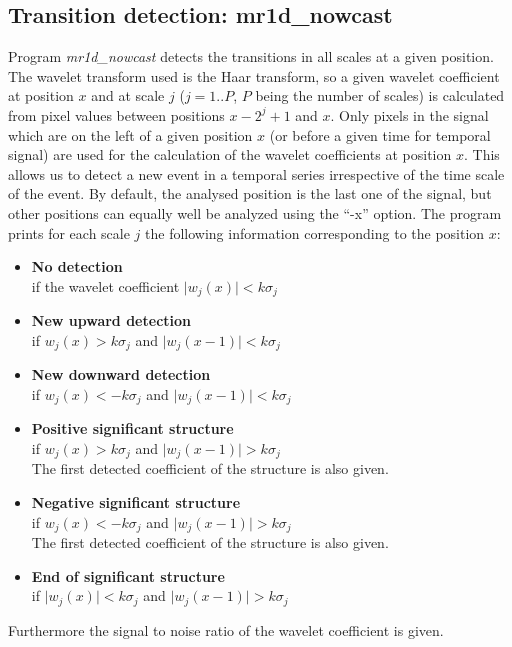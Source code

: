 \subsection{Transition detection: mr1d\_nowcast}
Program {\em mr1d\_nowcast} detects the transitions in all scales at a 
given position. The wavelet transform used is the Haar transform,
so a given wavelet coefficient at position $x$ and at scale $j$ ($j=1..P$,
$P$ being the number of scales)
is calculated from pixel values between  positions $x-2^{j}+1$ and $x$.
Only pixels in the signal which are on the left of a given position $x$
(or before a given time for temporal signal) are
used for the calculation of the wavelet coefficients at position $x$.
This allows us to detect a new event in a temporal series 
irrespective of the time 
scale of the event.
By default, the analysed position is the last one of the signal, but other
positions can equally well be analyzed using the ``-x'' option. The program
prints for each scale $j$ the following information corresponding to 
the position $x$:
\begin{itemize}
\item {\bf No detection} \\
 if the wavelet coefficient $\mid w_j(x) \mid  < k \sigma_j$
\item {\bf New upward detection}\\
 if $  w_j(x) > k \sigma_j$  and $\mid w_j(x-1) \mid  < k \sigma_j$
\item {\bf New downward detection}\\
 if $  w_j(x) < - k \sigma_j$ and $\mid w_j(x-1) \mid  < k \sigma_j$
\item {\bf Positive significant structure}\\
 if $  w_j(x) > k \sigma_j$ and $\mid w_j(x-1) \mid  > k \sigma_j$ \\
The first detected coefficient of the structure is also given.
\item {\bf Negative significant structure}\\
 if $  w_j(x) < -k \sigma_j$ and $\mid w_j(x-1) \mid  > k \sigma_j$ \\
The first detected coefficient of the structure is also given.
\item {\bf End of significant structure}\\
 if $\mid w_j(x) \mid  < k \sigma_j$ and $\mid w_j(x-1) \mid  > k \sigma_j$
\end{itemize}
Furthermore the signal to noise ratio of the wavelet coefficient is given.

